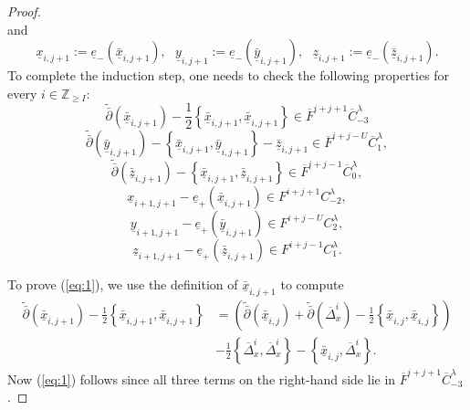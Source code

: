 \documentclass[a4paper]{article}
\numberwithin{equation}{section}
\begin{document}
\begin{proof}
\begin{equation}
\end{equation}
and
\begin{equation}
\underline{x}_{i,j+1}:=\underline{e}_-(\bar{\underline{x}}_{i,j+1}),\textrm{ }\underline{y}_{i,j+1}:=\underline{e}_-(\bar{\underline{y}}_{i,j+1}),\textrm{ }\underline{z}_{i,j+1}:=\underline{e}_-(\bar{\underline{z}}_{i,j+1}).
\end{equation}
To complete the induction step, one needs to check the following properties for every $i\in\mathbb{Z}_{\geq I}$:
\begin{equation}\label{eq:1}
\tilde{\bar{\partial}}(\bar{\underline{x}}_{i,j+1})-\frac{1}{2}\left\{\bar{\underline{x}}_{i,j+1},\bar{\underline{x}}_{i,j+1}\right\}\in\overline{F}^{i+j+1}\overline{C}_{-3}^\lambda
\end{equation}
\begin{equation}\label{eq:2}
\tilde{\bar{\partial}}(\bar{\underline{y}}_{i,j+1})-\left\{\bar{\underline{x}}_{i,j+1},\bar{\underline{y}}_{i,j+1}\right\}-\bar{\underline{z}}_{i,j+1}\in\overline{F}^{i+j-U}\overline{C}_1^\lambda,
\end{equation}
\begin{equation}\label{eq:3}
\tilde{\bar{\partial}}(\bar{\underline{z}}_{i,j+1})-\left\{\bar{\underline{x}}_{i,j+1},\bar{\underline{z}}_{i,j+1}\right\}\in\overline{F}^{i+j-1}\overline{C}_0^\lambda,
\end{equation}
\begin{equation}\label{eq:4}
\underline{x}_{i+1,j+1}-\underline{e}_+(\bar{\underline{x}}_{i,j+1})\in F^{i+j+1}C_{-2}^\lambda,
\end{equation}
\begin{equation}\label{eq:5}
\underline{y}_{i+1,j+1}-\underline{e}_+(\bar{\underline{y}}_{i,j+1})\in F^{i+j-U}C_2^\lambda,
\end{equation}
\begin{equation}\label{eq:6}
\underline{z}_{i+1,j+1}-\underline{e}_+(\bar{\underline{z}}_{i,j+1})\in F^{i+j-1}C_1^\lambda.
\end{equation}

To prove (\ref{eq:1}), we use the definition of $\bar{\underline{x}}_{i,j+1}$ to compute
\begin{equation}
\begin{split}
\tilde{\bar{\partial}}(\bar{\underline{x}}_{i,j+1})-\frac{1}{2}\left\{\bar{\underline{x}}_{i,j+1},\bar{\underline{x}}_{i,j+1}\right\}&=\left(\tilde{\bar{\partial}}(\bar{\underline{x}}_{i,j})+\tilde{\bar{\partial}}(\overline{\Delta}_x^i)-\frac{1}{2}\left\{\bar{\underline{x}}_{i,j},\bar{\underline{x}}_{i,j}\right\}\right) \\
&-\frac{1}{2}\left\{\overline{\Delta}_x^i,\overline{\Delta}_x^i\right\}-\left\{\bar{\underline{x}}_{i,j},\overline{\Delta}_x^i\right\}.
\end{split}
\end{equation}
Now (\ref{eq:1}) follows since all three terms on the right-hand side lie in $\overline{F}^{i+j+1}\overline{C}_{-3}^\lambda$.


\end{proof}
\end{document}
